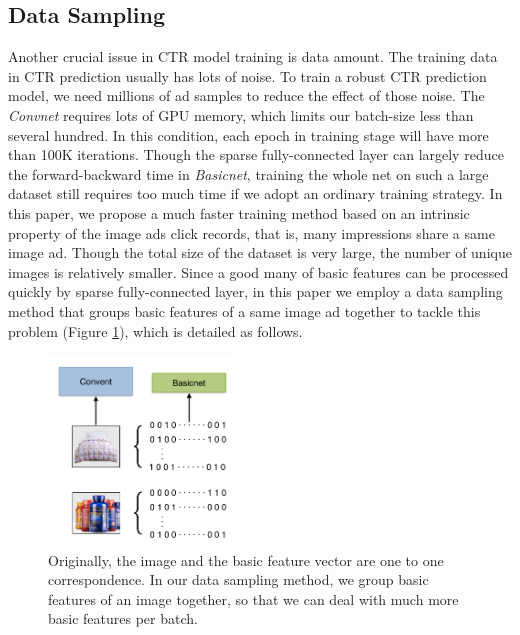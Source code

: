 \documentclass{sig-alternate}
\begin{document}
\subsection{Data Sampling}
Another crucial issue in CTR model training is data amount. The training data in CTR prediction usually has lots of noise. To train a robust CTR prediction model, we need  millions of ad samples to reduce the effect of those noise. The \emph{Convnet} requires lots of GPU memory, which limits our batch-size less than several hundred. In this condition, each epoch in training stage will have more than 100K iterations.  Though the sparse fully-connected layer can largely reduce the forward-backward time in \emph{Basicnet}, training the whole net on such a large dataset still requires too much time if we adopt an ordinary training strategy. In this paper, we propose a much faster training method based on an intrinsic property of the image ads click records, that is, many impressions share a same image ad. Though the total size of the dataset is very large, the number of unique images is relatively smaller. Since a good many of basic features can be processed quickly by sparse fully-connected layer, in this paper we employ a data sampling method that groups basic features of a same image ad together to tackle this problem (Figure \ref{fig:sampling}), which is detailed as follows.
\begin{figure}
	\centering
	\includegraphics[width=0.45\textwidth]{sampling}
	\caption{Originally, the image and the basic feature vector are one to one correspondence. In our data sampling method, we group basic features of an image together, so that we can deal with much more basic features per batch. }
	\label{fig:sampling}
\end{figure}
\end{document}
